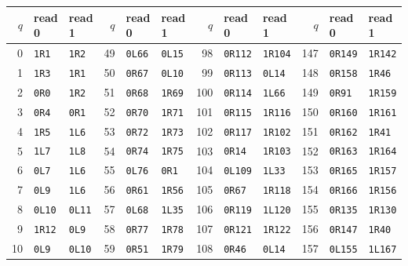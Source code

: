 \begin{center}\footnotesize
\setlength{\tabcolsep}{4pt}
\renewcommand{\arraystretch}{1.04}
\begin{tabular}{@{}rll@{\hspace{1.6em}}rll@{\hspace{1.6em}}rll@{\hspace{1.6em}}rll@{}}
\toprule
$q$ & read 0 & read 1 & $q$ & read 0 & read 1 & $q$ & read 0 & read 1 & $q$ & read 0 & read 1\\
\midrule
0 & \texttt{1R1} & \texttt{1R2} & 49 & \texttt{0L66} & \texttt{0L15} & 98 & \texttt{0R112} & \texttt{1R104} & 147 & \texttt{0R149} & \texttt{1R142}\\
1 & \texttt{1R3} & \texttt{1R1} & 50 & \texttt{0R67} & \texttt{0L10} & 99 & \texttt{0R113} & \texttt{0L14} & 148 & \texttt{0R158} & \texttt{1R46}\\
2 & \texttt{0R0} & \texttt{1R2} & 51 & \texttt{0R68} & \texttt{1R69} & 100 & \texttt{0R114} & \texttt{1L66} & 149 & \texttt{0R91} & \texttt{1R159}\\
3 & \texttt{0R4} & \texttt{0R1} & 52 & \texttt{0R70} & \texttt{1R71} & 101 & \texttt{0R115} & \texttt{1R116} & 150 & \texttt{0R160} & \texttt{1R161}\\
4 & \texttt{1R5} & \texttt{1L6} & 53 & \texttt{0R72} & \texttt{1R73} & 102 & \texttt{0R117} & \texttt{1R102} & 151 & \texttt{0R162} & \texttt{1R41}\\
5 & \texttt{1L7} & \texttt{1L8} & 54 & \texttt{0R74} & \texttt{1R75} & 103 & \texttt{0R14} & \texttt{1R103} & 152 & \texttt{0R163} & \texttt{1R164}\\
6 & \texttt{0L7} & \texttt{1L6} & 55 & \texttt{0L76} & \texttt{0R1} & 104 & \texttt{0L109} & \texttt{1L33} & 153 & \texttt{0R165} & \texttt{1R157}\\
7 & \texttt{0L9} & \texttt{1L6} & 56 & \texttt{0R61} & \texttt{1R56} & 105 & \texttt{0R67} & \texttt{1R118} & 154 & \texttt{0R166} & \texttt{1R156}\\
8 & \texttt{0L10} & \texttt{0L11} & 57 & \texttt{0L68} & \texttt{1L35} & 106 & \texttt{0R119} & \texttt{1L120} & 155 & \texttt{0R135} & \texttt{1R130}\\
9 & \texttt{1R12} & \texttt{0L9} & 58 & \texttt{0R77} & \texttt{1R78} & 107 & \texttt{0R121} & \texttt{1R122} & 156 & \texttt{0R147} & \texttt{1R40}\\
10 & \texttt{0L9} & \texttt{0L10} & 59 & \texttt{0R51} & \texttt{1R79} & 108 & \texttt{0R46} & \texttt{0L14} & 157 & \texttt{0L155} & \texttt{1L167}\\

\end{tabular}
\end{center}

